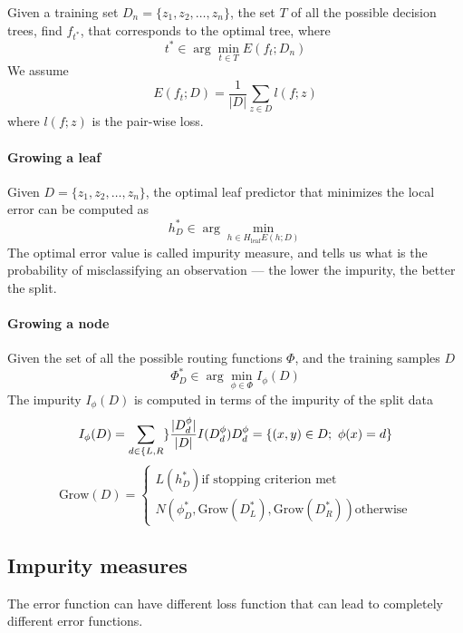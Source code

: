 \documentclass[a4paper,6pt,twocolumn,fleqn]{article}
\begin{document}
Given a training set \(D_n = \{z_1, z_2, \ldots, z_n\}\), the set \(T\) of all the possible decision trees, find \(f_{t^*}\), that corresponds to the optimal tree, where
\begin{equation}
    t^* \in \arg \min_{t \in T} E(f_t; D_n)
\end{equation}
We assume
\begin{equation}
    E(f_t;D) = \frac 1 {|D|} \sum_{z \in D} l(f;z)
\end{equation}
where \(l(f;z)\) is the pair-wise loss.
\paragraph{Growing a leaf}
Given \(D = \{z_1, z_2, \ldots, z_n\}\), the optimal leaf predictor that minimizes the local error can be computed as
\begin{equation}
    h_D^* \in \arg \min_{h \in H_\text{leaf} E(h;D)}
\end{equation}
The optimal error value is called impurity measure, and tells us what is the probability of misclassifying an observation --- the lower the impurity, the better the split.
\paragraph{Growing a node}
Given the set of all the possible routing functions \(\Phi\), and the training samples \(D\)
\begin{equation}
    \Phi_D^* \in \arg \min_{\phi \in \Phi} I_\phi(D)
\end{equation}
The impurity \(I_\phi(D)\) is computed in terms of the impurity of the split data
\begin{equation}
    I_\phi(D) = \sum_{d \in \{L,R}\} \frac {|D_d^\phi|} {|D|} I(D_d^\phi)\\
    D_d^\phi = \{(x,y) \in D;\ \phi(x) = d\}
\end{equation}
\begin{equation}
    \text{Grow}(D) = \begin{cases}
        L(h^*_D) \text{if stopping criterion met}\\
        N(\phi_D^*, \text{Grow}(D_L^*), \text{Grow}(D_R^*)) \text{otherwise}
    \end{cases}
\end{equation}
\subsection{Impurity measures} %
The error function can have different loss function that can lead to completely different error functions.
\end{document}
